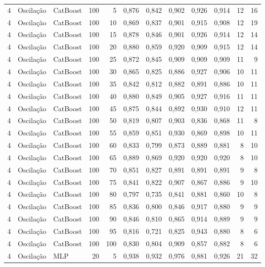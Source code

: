 \begin{longtable}{@{}rllrrrrrrrrr@{}}
4 & Oscilação & CatBoost & 100 & 5 & 0,876 & 0,842 & 0,902 & 0,926 & 0,914 & 12 & 16 \\
4 & Oscilação & CatBoost & 100 & 10 & 0,869 & 0,837 & 0,901 & 0,915 & 0,908 & 12 & 19 \\
4 & Oscilação & CatBoost & 100 & 15 & 0,878 & 0,846 & 0,901 & 0,926 & 0,914 & 12 & 14 \\
4 & Oscilação & CatBoost & 100 & 20 & 0,880 & 0,859 & 0,920 & 0,909 & 0,915 & 12 & 14 \\
4 & Oscilação & CatBoost & 100 & 25 & 0,872 & 0,845 & 0,909 & 0,909 & 0,909 & 11 & 9 \\
4 & Oscilação & CatBoost & 100 & 30 & 0,865 & 0,825 & 0,886 & 0,927 & 0,906 & 10 & 11 \\
4 & Oscilação & CatBoost & 100 & 35 & 0,842 & 0,812 & 0,882 & 0,891 & 0,886 & 10 & 11 \\
4 & Oscilação & CatBoost & 100 & 40 & 0,880 & 0,849 & 0,905 & 0,927 & 0,916 & 11 & 11 \\
4 & Oscilação & CatBoost & 100 & 45 & 0,875 & 0,844 & 0,892 & 0,930 & 0,910 & 12 & 11 \\
4 & Oscilação & CatBoost & 100 & 50 & 0,819 & 0,807 & 0,903 & 0,836 & 0,868 & 11 & 8 \\
4 & Oscilação & CatBoost & 100 & 55 & 0,859 & 0,851 & 0,930 & 0,869 & 0,898 & 10 & 11 \\
4 & Oscilação & CatBoost & 100 & 60 & 0,833 & 0,799 & 0,873 & 0,889 & 0,881 & 8 & 10 \\
4 & Oscilação & CatBoost & 100 & 65 & 0,889 & 0,869 & 0,920 & 0,920 & 0,920 & 8 & 10 \\
4 & Oscilação & CatBoost & 100 & 70 & 0,851 & 0,827 & 0,891 & 0,891 & 0,891 & 9 & 8 \\
4 & Oscilação & CatBoost & 100 & 75 & 0,841 & 0,822 & 0,907 & 0,867 & 0,886 & 9 & 10 \\
4 & Oscilação & CatBoost & 100 & 80 & 0,797 & 0,735 & 0,841 & 0,881 & 0,860 & 10 & 8 \\
4 & Oscilação & CatBoost & 100 & 85 & 0,836 & 0,800 & 0,846 & 0,917 & 0,880 & 9 & 9 \\
4 & Oscilação & CatBoost & 100 & 90 & 0,846 & 0,810 & 0,865 & 0,914 & 0,889 & 9 & 9 \\
4 & Oscilação & CatBoost & 100 & 95 & 0,816 & 0,721 & 0,825 & 0,943 & 0,880 & 8 & 6 \\
4 & Oscilação & CatBoost & 100 & 100 & 0,830 & 0,804 & 0,909 & 0,857 & 0,882 & 8 & 6 \\
4 & Oscilação & MLP & 20 & 5 & 0,938 & 0,932 & 0,976 & 0,881 & 0,926 & 21 & 32 \\

\end{longtable}
